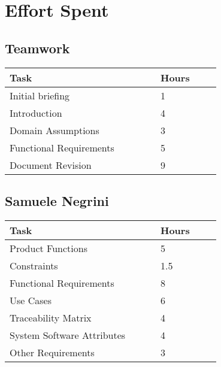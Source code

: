 \chapter{Effort Spent}
\vspace{-10mm}
\section{Teamwork}
\vspace{1mm}
\begin{center}
    \begin{tabular}{@{}p{0.5\linewidth} p{0.2\linewidth}@{}}
        \hline
        \textbf{Task} & \textbf{Hours} \\ \hline
        Initial briefing & 1 \\ \hline
        Introduction & 4 \\ \hline
        Domain Assumptions & 3 \\ \hline
        Functional Requirements & 5 \\ \hline
        Document Revision & 9 \\ \hline
    \end{tabular}
\end{center}

\section{Samuele Negrini}
\vspace{1mm}
\begin{center}
	\begin{tabular}{@{}p{0.5\linewidth} p{0.2\linewidth}@{}}
		\hline
		\textbf{Task} & \textbf{Hours} \\ \hline
		Product Functions & 5 \\ \hline
		Constraints & 1.5 \\ \hline
        Functional Requirements & 8 \\ \hline
        Use Cases & 6 \\ \hline
        Traceability Matrix & 4 \\ \hline
        System Software Attributes & 4 \\ \hline
        Other Requirements & 3 \\ \hline
	\end{tabular}
\end{center}

